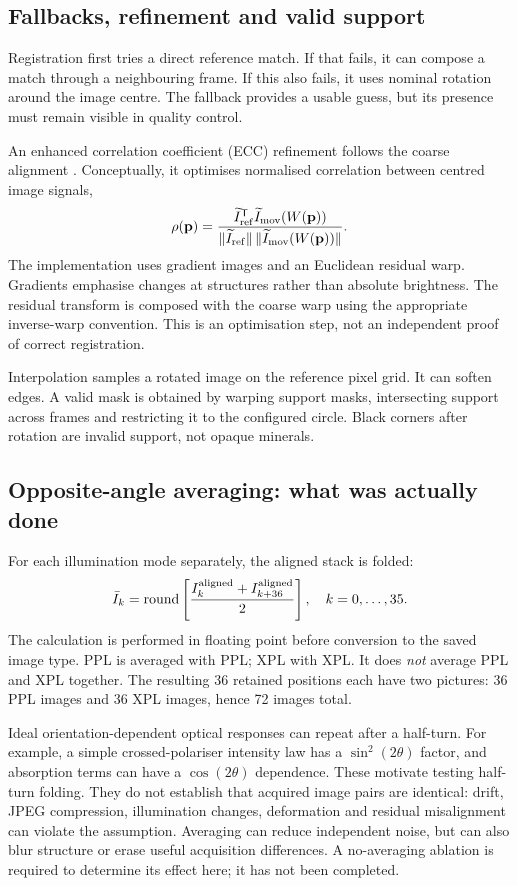 \subsection{Fallbacks, refinement and valid support}
Registration first tries a direct reference match. If that fails, it can compose a match through a neighbouring frame. If this also fails, it uses nominal rotation around the image centre. The fallback provides a usable guess, but its presence must remain visible in quality control.

An enhanced correlation coefficient (ECC) refinement follows the coarse alignment \cite{ecc}. Conceptually, it optimises normalised correlation between centred image signals,
\begin{equation}
\rho(\mathbf p)=\frac{\widetilde I_{\rm ref}^{\mathsf T}\widetilde I_{\rm mov}(W(\mathbf p))}
{\|\widetilde I_{\rm ref}\|\,\|\widetilde I_{\rm mov}(W(\mathbf p))\|}.
\end{equation}
The implementation uses gradient images and an Euclidean residual warp. Gradients emphasise changes at structures rather than absolute brightness. The residual transform is composed with the coarse warp using the appropriate inverse-warp convention. This is an optimisation step, not an independent proof of correct registration.

Interpolation samples a rotated image on the reference pixel grid. It can soften edges. A valid mask is obtained by warping support masks, intersecting support across frames and restricting it to the configured circle. Black corners after rotation are invalid support, not opaque minerals.

\subsection{Opposite-angle averaging: what was actually done}
For each illumination mode separately, the aligned stack is folded:
\begin{equation}\label{eq:fold}
\bar I_k=\operatorname{round}\left[\frac{I^{\rm aligned}_k+I^{\rm aligned}_{k+36}}2\right],
\quad k=0,\ldots,35.
\end{equation}
The calculation is performed in floating point before conversion to the saved image type. PPL is averaged with PPL; XPL with XPL. It does \emph{not} average PPL and XPL together. The resulting 36 retained positions each have two pictures: 36 PPL images and 36 XPL images, hence 72 images total.

Ideal orientation-dependent optical responses can repeat after a half-turn. For example, a simple crossed-polariser intensity law has a $\sin^2(2\theta)$ factor, and absorption terms can have a $\cos(2\theta)$ dependence. These motivate testing half-turn folding. They do not establish that acquired image pairs are identical: drift, JPEG compression, illumination changes, deformation and residual misalignment can violate the assumption. Averaging can reduce independent noise, but can also blur structure or erase useful acquisition differences. A no-averaging ablation is required to determine its effect here; it has not been completed.

